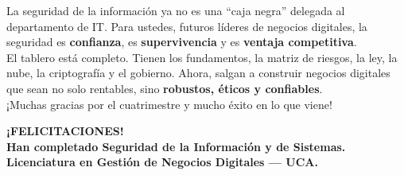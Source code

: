 \documentclass[12pt,a4paper]{article}
\begin{document}
\vspace{10pt}

\begin{cajaNota}[title={Palabras finales del docente}]
La seguridad de la informaci\'on ya no es una ``caja negra'' delegada al departamento de IT. Para ustedes, futuros l\'ideres de negocios digitales, la seguridad es \textbf{confianza}, es \textbf{supervivencia} y es \textbf{ventaja competitiva}.\\[6pt]
El tablero est\'a completo. Tienen los fundamentos, la matriz de riesgos, la ley, la nube, la criptograf\'ia y el gobierno. Ahora, salgan a construir negocios digitales que sean no solo rentables, sino \textbf{robustos, \'eticos y confiables}.\\[6pt]
¡Muchas gracias por el cuatrimestre y mucho \'exito en lo que viene!
\end{cajaNota}

\vfill
\begin{center}
\Large\bfseries\color{azulUCA}
¡FELICITACIONES!\\[6pt]
\normalsize\color{gray}
Han completado Seguridad de la Informaci\'on y de Sistemas.\\
Licenciatura en Gesti\'on de Negocios Digitales --- UCA.
\end{center}
\end{document}
